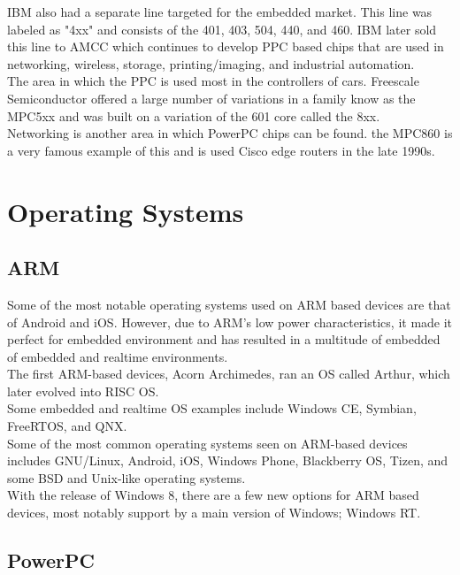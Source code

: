 \documentclass[letterpaper,10pt,titlepage]{article}
\begin{document}
IBM also had a separate line targeted for the embedded market. This line was labeled as "4xx" and consists of the 401, 403, 504, 440, and 460. IBM later sold this line to AMCC which continues to develop PPC based chips that are used in networking, wireless, storage, printing/imaging, and industrial automation.\\

The area in which the PPC is used most in the controllers of cars. Freescale Semiconductor offered a large number of variations in a family know as the MPC5xx and was built on a variation of the 601 core called the 8xx.\\

Networking is another area in which PowerPC chips can be found. the MPC860 is a very famous example of this and is used Cisco edge routers in the late 1990s.

\section{Operating Systems}
\subsection{ARM}

Some of the most notable operating systems used on ARM based devices are that of Android and iOS. However, due to ARM's low power characteristics, it made it perfect for embedded environment and has resulted in a multitude of embedded of embedded and realtime environments.\\

The first ARM-based devices, Acorn Archimedes, ran an OS called Arthur, which later evolved into RISC OS.\\

Some embedded and realtime OS examples include Windows CE, Symbian, FreeRTOS, and QNX.\\

Some of the most common operating systems seen on ARM-based devices includes GNU/Linux, Android, iOS, Windows Phone, Blackberry OS, Tizen, and some BSD and Unix-like operating systems.\\

With the release of Windows 8, there are a few new options for ARM based devices, most notably support by a main version of Windows; Windows RT.

\subsection{PowerPC}
\end{document}
